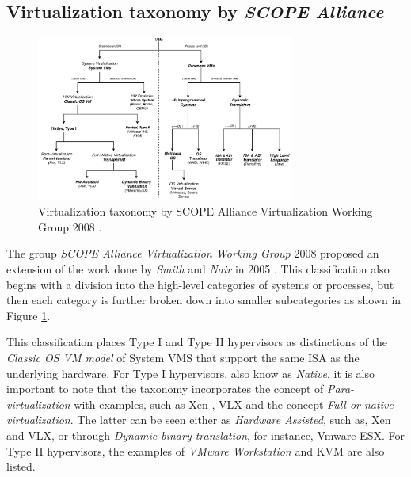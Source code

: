 	\subsection{Virtualization taxonomy by \textit{SCOPE Alliance}}
	
	\begin{figure}[H]
		\centering
		\includegraphics[width=8.5cm]{images/ScopeAlliance2008.pdf}
		\vspace{-0.2cm}
		\caption{Virtualization taxonomy by SCOPE Alliance Virtualization Working Group 2008 \cite{SCOPEAlliance2008}.}
		\label{fig:TaxonomyVirtualizationSCOPEAlliance2008}
	\end{figure}
	
    The group \textit{SCOPE Alliance Virtualization Working Group} 2008 proposed an extension of the work done  by \textit{Smith} and \textit{Nair} in 2005 \cite{Smith2005} \cite{SCOPEAlliance2008}. This classification also begins with a division into the high-level categories of systems or processes, but then each category is further broken down into smaller subcategories as shown in Figure \ref{fig:TaxonomyVirtualizationSCOPEAlliance2008}. 
	
	
	
	
	This classification places Type I and Type II hypervisors as distinctions of the \textit{Classic OS VM model} of System VMS that support the same ISA as the underlying hardware.  For Type I hypervisors, also know as \textit{Native}, it is also important to note that the taxonomy incorporates the concept of \textit{Para-virtualization} with examples, such as Xen \cite{Xen2018Website, Xen2018WebsiteCambridge}, VLX \cite{Armand2009} and the concept \textit{Full or native virtualization}. The latter can be seen either as \textit{Hardware Assisted}, such as, Xen and VLX,  or through \textit{Dynamic binary translation}, for instance, Vmware ESX. For Type II hypervisors, the examples of \textit{VMware Workstation} \cite{VMware2018Website} and KVM \cite{KVM} are also listed. 
	
